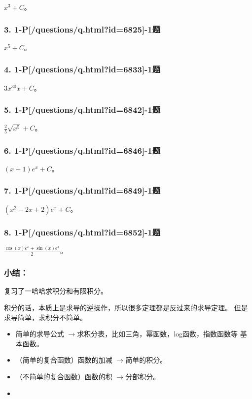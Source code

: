 \documentclass[12pt,a4paper,]{article}
\begin{document}
\(x^3+C\)。

\hypertarget{pquestionsq.htmlid6825-1ux9898}{%
\subsubsection{3.
1-P{[}/questions/q.html?id=6825{]}-1题}\label{pquestionsq.htmlid6825-1ux9898}}

\(x^5+C\)。

\hypertarget{pquestionsq.htmlid6833-1ux9898}{%
\subsubsection{4.
1-P{[}/questions/q.html?id=6833{]}-1题}\label{pquestionsq.htmlid6833-1ux9898}}

\(3x^30x+C\)。

\hypertarget{pquestionsq.htmlid6842-1ux9898}{%
\subsubsection{5.
1-P{[}/questions/q.html?id=6842{]}-1题}\label{pquestionsq.htmlid6842-1ux9898}}

\(\frac{2}{5}\sqrt{x^5}+C\)。

\hypertarget{pquestionsq.htmlid6846-1ux9898}{%
\subsubsection{6.
1-P{[}/questions/q.html?id=6846{]}-1题}\label{pquestionsq.htmlid6846-1ux9898}}

\((x+1)e^x+C\)。

\hypertarget{pquestionsq.htmlid6849-1ux9898}{%
\subsubsection{7.
1-P{[}/questions/q.html?id=6849{]}-1题}\label{pquestionsq.htmlid6849-1ux9898}}

\((x^2-2x+2)e^x+C\)。

\hypertarget{pquestionsq.htmlid6852-1ux9898}{%
\subsubsection{8.
1-P{[}/questions/q.html?id=6852{]}-1题}\label{pquestionsq.htmlid6852-1ux9898}}

\(\frac{\cos(x)e^x+\sin(x)e^x}{2}\)。

\hypertarget{ux5c0fux7ed3}{%
\subsubsection{小结：}\label{ux5c0fux7ed3}}

复习了一哈哈求积分和有限积分。

积分的话，本质上是求导的逆操作，所以很多定理都是反过来的求导定理。
但是求导简单，求积分不简单。

\begin{itemize}
\item
  简单的求导公式
  $\longrightarrow$求积分表，比如三角，幂函数，log函数，指数函数等
  基本函数。
\item
  （简单的复合函数）函数的加减 $\longrightarrow$简单的积分。
\item
  （不简单的复合函数）函数的积 $\longrightarrow$分部积分。
\item
\end{itemize}
\end{document}
